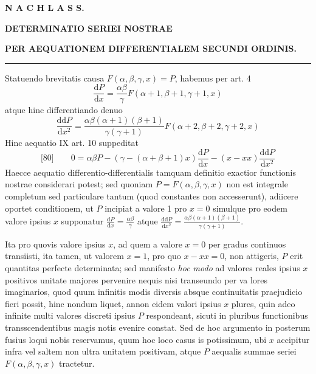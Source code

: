 \clearpage{}
\begin{center}
\textbf{N A C H L A S S.}\par\medskip
\textbf{DETERMINATIO SERIEI NOSTRAE}\par\medskip
\textbf{PER AEQUATIONEM DIFFERENTIALEM SECUNDI ORDINIS.}\par\medskip
\rule{0.08\linewidth}{0.3pt}\par\bigskip
\end{center}
Statuendo brevitatis causa \(F(\alpha,\beta,\gamma,x)=P\), habemus per art. 4
\[
\frac{\mathrm{d}P}{\mathrm{d}x}=\frac{\alpha\beta}{\gamma}
F(\alpha+1,\beta+1,\gamma+1,x)
\]
atque hinc differentiando denuo
\[
\frac{\mathrm{dd}P}{\mathrm{d}x^2}
=\frac{\alpha\beta(\alpha+1)(\beta+1)}{\gamma(\gamma+1)}
F(\alpha+2,\beta+2,\gamma+2,x)
\]
Hinc aequatio IX art. 10 suppeditat
\[
\text{[80]}\qquad
0=\alpha\beta P-(\gamma-(\alpha+\beta+1)x)
\frac{\mathrm{d}P}{\mathrm{d}x}-(x-xx)\frac{\mathrm{dd}P}{\mathrm{d}x^2}
\]
Haecce aequatio differentio-differentialis tamquam definitio exactior
functionis nostrae considerari potest; sed quoniam \(P=F(\alpha,\beta,\gamma,x)\)
non est integrale completum sed particulare tantum (quod constantes non
accesserunt), adiicere oportet conditionem, ut \(P\) incipiat a valore 1
pro \(x=0\) simulque pro eodem valore ipsius \(x\) supponatur
\(\frac{\mathrm{d}P}{\mathrm{d}x}=\frac{\alpha\beta}{\gamma}\)
atque
\(\frac{\mathrm{dd}P}{\mathrm{d}x^2}
=\frac{\alpha\beta(\alpha+1)(\beta+1)}{\gamma(\gamma+1)}\).

Ita pro quovis valore ipsius \(x\), ad quem a valore \(x=0\) per gradus
continuos transiisti, ita tamen, ut valorem \(x=1\), pro quo \(x-xx=0\),
non attigeris, \(P\) erit quantitas perfecte determinata; sed manifesto
\emph{hoc modo} ad valores reales ipsius \(x\) positivos unitate majores
pervenire nequis nisi transeundo per va%
lores imaginarios, quod quum infinitis modis diversis absque continuitatis
praejudicio fieri possit, hinc nondum liquet, annon eidem valori ipsius
\(x\) plures, quin adeo infinite multi valores discreti ipsius \(P\)
respondeant, sicuti in pluribus functionibus transscendentibus magis notis
evenire constat. Sed de hoc argumento in posterum fusius loqui nobis
reservamus, quum hoc loco casus is potissimum, ubi \(x\) accipitur infra
vel saltem non ultra unitatem positivam, atque \(P\) aequalis summae
seriei \(F(\alpha,\beta,\gamma,x)\) tractetur.

